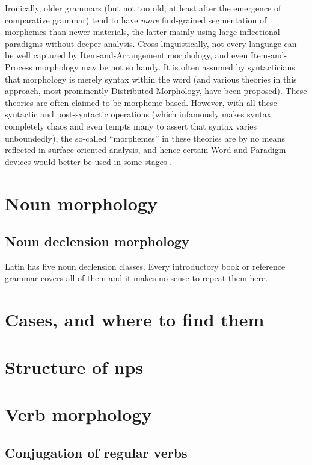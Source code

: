 \documentclass{article}
\begin{document}
Ironically, older grammars (but not too old; at least after the emergence of comparative grammar)
tend to have \emph{more} find-grained segmentation of morphemes than newer materials,
the latter mainly using large inflectional paradigms without deeper analysis.
Cross-linguistically, not every language can be well captured by Item-and-Arrangement morphology,
and even Item-and-Process morphology may be not so handy.
It is often assumed by syntacticians that morphology is merely syntax within the word 
(and various theories in this approach, most prominently Distributed Morphology, have been proposed).
These theories are often claimed to be morpheme-based.
However, with all these syntactic and post-syntactic operations 
(which infamously makes syntax completely chaos and even tempts many to assert that syntax varies unboundedly),
the so-called ``morphemes'' in these theories are by no means reflected in surface-oriented analysis,
and hence certain Word-and-Paradigm devices would better be used in some stages \citep{anderson2017words}.

\section{Noun morphology}

\subsection{Noun declension morphology}

Latin has five noun declension classes.
Every introductory book or reference grammar covers all of them and it makes no sense to repeat them here.


\section{Cases, and where to find them}\label{sec:case}

\section{Structure of \acl{np}s}

\section{Verb morphology}

\subsection{Conjugation of regular verbs}
\end{document}
